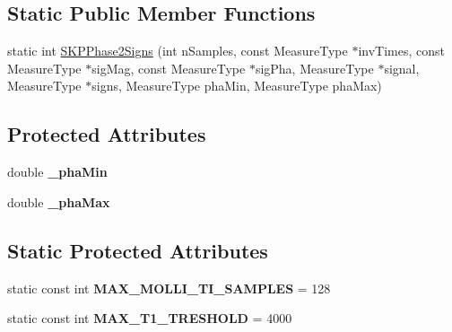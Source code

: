 \subsection*{Static Public Member Functions}
\begin{DoxyCompactItemize}
\item 
static int \hyperlink{class_ox_1_1_sign_calculator_shmolli_a281487db14afd7142d0a9439fd8d319d}{S\+K\+P\+Phase2\+Signs} (int n\+Samples, const Measure\+Type $\ast$inv\+Times, const Measure\+Type $\ast$sig\+Mag, const Measure\+Type $\ast$sig\+Pha, Measure\+Type $\ast$signal, Measure\+Type $\ast$signs, Measure\+Type pha\+Min, Measure\+Type pha\+Max)
\end{DoxyCompactItemize}
\subsection*{Protected Attributes}
\begin{DoxyCompactItemize}
\item 
double {\bfseries \+\_\+pha\+Min}\hypertarget{class_ox_1_1_sign_calculator_shmolli_a3384cfa4793a5a6e9e6285d70b3131be}{}\label{class_ox_1_1_sign_calculator_shmolli_a3384cfa4793a5a6e9e6285d70b3131be}

\item 
double {\bfseries \+\_\+pha\+Max}\hypertarget{class_ox_1_1_sign_calculator_shmolli_a1b17399c7a9c9a30dd2fcb9a09db3ae8}{}\label{class_ox_1_1_sign_calculator_shmolli_a1b17399c7a9c9a30dd2fcb9a09db3ae8}

\end{DoxyCompactItemize}
\subsection*{Static Protected Attributes}
\begin{DoxyCompactItemize}
\item 
static const int {\bfseries M\+A\+X\+\_\+\+M\+O\+L\+L\+I\+\_\+\+T\+I\+\_\+\+S\+A\+M\+P\+L\+ES} = 128\hypertarget{class_ox_1_1_sign_calculator_shmolli_a885834272c7d64afc5faae54fce33e8b}{}\label{class_ox_1_1_sign_calculator_shmolli_a885834272c7d64afc5faae54fce33e8b}

\item 
static const int {\bfseries M\+A\+X\+\_\+\+T1\+\_\+\+T\+R\+E\+S\+H\+O\+LD} = 4000\hypertarget{class_ox_1_1_sign_calculator_shmolli_a6540643a5e432b753b631a5abc7b0619}{}\label{class_ox_1_1_sign_calculator_shmolli_a6540643a5e432b753b631a5abc7b0619}

\end{DoxyCompactItemize}


